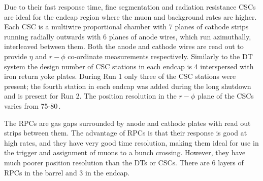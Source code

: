 Due to their fast response time, fine segmentation and radiation resistance \ac{CSC}s are ideal for the endcap region where the muon and background rates are higher. Each \ac{CSC} is a multiwire proportional chamber with 7 planes of cathode strips running radially outwards with 6 planes of anode wires, which run azimuthally, interleaved between them. Both the anode and cathode wires are read out to provide $\eta$ and $r-\phi$ co-ordinate measurements respectively. Similarly to the \ac{DT} system the design number of \ac{CSC} stations in each endcap is 4 interspersed with iron return yoke plates. During Run 1 only three of the \ac{CSC} stations were present; the fourth station in each endcap was added during the long shutdown and is present for Run 2. The position resolution in the $r-\phi$ plane of the \ac{CSC}s varies from 75-80\,\micron.

The \ac{RPC}s are gas gaps surrounded by anode and cathode plates with read out strips between them. The advantage of \ac{RPC}s is that their response is good at high rates, and they have very good time resolution, making them ideal for use in the trigger and assignment of muons to a bunch crossing. However, they have much poorer position resolution than the \ac{DT}s or \ac{CSC}s. There are 6 layers of \ac{RPC}s in the barrel and 3 in the endcap.

